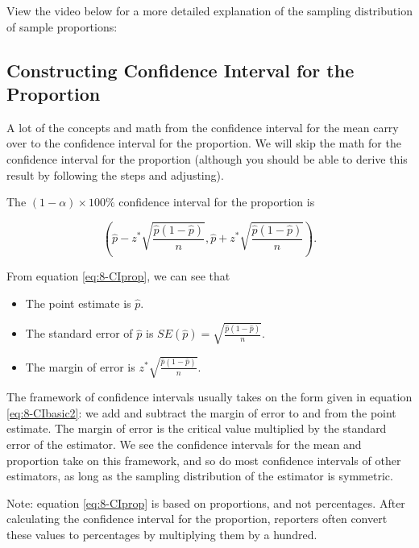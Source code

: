\documentclass[
]{book}
\providecommand{\tightlist}{%
  \setlength{\itemsep}{0pt}\setlength{\parskip}{0pt}}
\begin{document}
View the video below for a more detailed explanation of the sampling distribution of sample proportions:

\hypertarget{constructing-confidence-interval-for-the-proportion}{%
\subsection{Constructing Confidence Interval for the Proportion}\label{constructing-confidence-interval-for-the-proportion}}

A lot of the concepts and math from the confidence interval for the mean carry over to the confidence interval for the proportion. We will skip the math for the confidence interval for the proportion (although you should be able to derive this result by following the steps and adjusting).

The \((1-\alpha) \times 100\%\) confidence interval for the proportion is

\begin{equation} 
\left( \hat{p} - z^{*} \sqrt{\frac{\hat{p}(1-\hat{p})}{n}}, \hat{p} + z^{*} \sqrt{\frac{\hat{p}(1-\hat{p})}{n}} \right).
\label{eq:8-CIprop}
\end{equation}

From equation \eqref{eq:8-CIprop}, we can see that

\begin{itemize}
\tightlist
\item
  The point estimate is \(\hat{p}\).
\item
  The standard error of \(\hat{p}\) is \(SE(\hat{p}) = \sqrt{\frac{\hat{p}(1-\hat{p})}{n}}\).
\item
  The margin of error is \(z^{*} \sqrt{\frac{\hat{p}(1-\hat{p})}{n}}\).
\end{itemize}

The framework of confidence intervals usually takes on the form given in equation \eqref{eq:8-CIbasic2}: we add and subtract the margin of error to and from the point estimate. The margin of error is the critical value multiplied by the standard error of the estimator. We see the confidence intervals for the mean and proportion take on this framework, and so do most confidence intervals of other estimators, as long as the sampling distribution of the estimator is symmetric.

Note: equation \eqref{eq:8-CIprop} is based on proportions, and not percentages. After calculating the confidence interval for the proportion, reporters often convert these values to percentages by multiplying them by a hundred.
\end{document}
